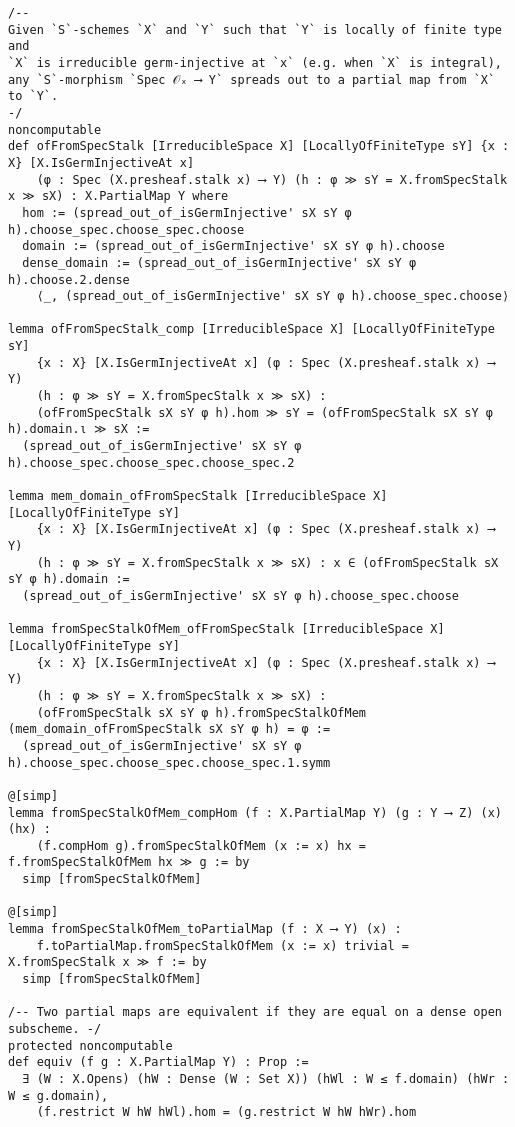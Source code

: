 \documentclass{article}
\begin{document}
\begin{lstlisting}[language=Lean, caption={RationalMap.lean}]
/--
Given `S`-schemes `X` and `Y` such that `Y` is locally of finite type and
`X` is irreducible germ-injective at `x` (e.g. when `X` is integral),
any `S`-morphism `Spec 𝒪ₓ ⟶ Y` spreads out to a partial map from `X` to `Y`.
-/
noncomputable
def ofFromSpecStalk [IrreducibleSpace X] [LocallyOfFiniteType sY] {x : X} [X.IsGermInjectiveAt x]
    (φ : Spec (X.presheaf.stalk x) ⟶ Y) (h : φ ≫ sY = X.fromSpecStalk x ≫ sX) : X.PartialMap Y where
  hom := (spread_out_of_isGermInjective' sX sY φ h).choose_spec.choose_spec.choose
  domain := (spread_out_of_isGermInjective' sX sY φ h).choose
  dense_domain := (spread_out_of_isGermInjective' sX sY φ h).choose.2.dense
    ⟨_, (spread_out_of_isGermInjective' sX sY φ h).choose_spec.choose⟩

lemma ofFromSpecStalk_comp [IrreducibleSpace X] [LocallyOfFiniteType sY]
    {x : X} [X.IsGermInjectiveAt x] (φ : Spec (X.presheaf.stalk x) ⟶ Y)
    (h : φ ≫ sY = X.fromSpecStalk x ≫ sX) :
    (ofFromSpecStalk sX sY φ h).hom ≫ sY = (ofFromSpecStalk sX sY φ h).domain.ι ≫ sX :=
  (spread_out_of_isGermInjective' sX sY φ h).choose_spec.choose_spec.choose_spec.2

lemma mem_domain_ofFromSpecStalk [IrreducibleSpace X] [LocallyOfFiniteType sY]
    {x : X} [X.IsGermInjectiveAt x] (φ : Spec (X.presheaf.stalk x) ⟶ Y)
    (h : φ ≫ sY = X.fromSpecStalk x ≫ sX) : x ∈ (ofFromSpecStalk sX sY φ h).domain :=
  (spread_out_of_isGermInjective' sX sY φ h).choose_spec.choose

lemma fromSpecStalkOfMem_ofFromSpecStalk [IrreducibleSpace X] [LocallyOfFiniteType sY]
    {x : X} [X.IsGermInjectiveAt x] (φ : Spec (X.presheaf.stalk x) ⟶ Y)
    (h : φ ≫ sY = X.fromSpecStalk x ≫ sX) :
    (ofFromSpecStalk sX sY φ h).fromSpecStalkOfMem (mem_domain_ofFromSpecStalk sX sY φ h) = φ :=
  (spread_out_of_isGermInjective' sX sY φ h).choose_spec.choose_spec.choose_spec.1.symm

@[simp]
lemma fromSpecStalkOfMem_compHom (f : X.PartialMap Y) (g : Y ⟶ Z) (x) (hx) :
    (f.compHom g).fromSpecStalkOfMem (x := x) hx = f.fromSpecStalkOfMem hx ≫ g := by
  simp [fromSpecStalkOfMem]

@[simp]
lemma fromSpecStalkOfMem_toPartialMap (f : X ⟶ Y) (x) :
    f.toPartialMap.fromSpecStalkOfMem (x := x) trivial = X.fromSpecStalk x ≫ f := by
  simp [fromSpecStalkOfMem]

/-- Two partial maps are equivalent if they are equal on a dense open subscheme. -/
protected noncomputable
def equiv (f g : X.PartialMap Y) : Prop :=
  ∃ (W : X.Opens) (hW : Dense (W : Set X)) (hWl : W ≤ f.domain) (hWr : W ≤ g.domain),
    (f.restrict W hW hWl).hom = (g.restrict W hW hWr).hom


\end{lstlisting}
\end{document}
